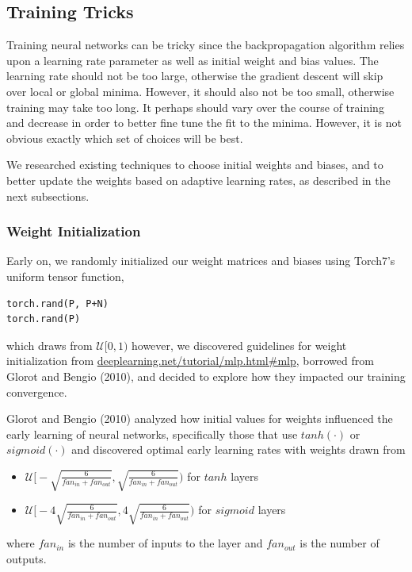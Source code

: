 \documentclass[11pt]{article}
\begin{document}
\subsection{Training Tricks}

Training neural networks can be tricky since the backpropagation algorithm relies upon a learning rate parameter as well as initial weight and bias values. The learning rate should not be too large, otherwise the gradient descent will skip over local or global minima. However, it should also not be too small, otherwise training may take too long. It perhaps should vary over the course of training and decrease in order to better fine tune the fit to the minima. However, it is not obvious exactly which set of choices will be best.

We researched existing techniques to choose initial weights and biases, and to better update the weights based on adaptive learning rates, as described in the next subsections.

\subsubsection{Weight Initialization}\label{Weights}

Early on, we randomly initialized our weight matrices and biases using Torch7's uniform tensor function,
\begin{lstlisting}
torch.rand(P, P+N)
torch.rand(P)
\end{lstlisting}
which draws from $\mathcal{U}[0, 1)$ however, we discovered guidelines for weight initialization from \hyperlink{http://deeplearning.net/tutorial/mlp.html\#mlp}{deeplearning.net/tutorial/mlp.html\#mlp}, borrowed from Glorot and Bengio (2010), and decided to explore how they impacted our training convergence.

Glorot and Bengio (2010) analyzed how initial values for weights influenced the early learning of neural networks, specifically those that use $tanh(\cdot)$ or $sigmoid(\cdot)$ and discovered optimal early learning rates with weights drawn from
\begin{itemize}
\item $\mathcal{U}\Big[-\sqrt{\frac{6}{fan_{in}+fan_{out}}},\sqrt{\frac{6}{fan_{in}+fan_{out}}}\Big)$ for $tanh$ layers
\item $\mathcal{U}\Big[-4\sqrt{\frac{6}{fan_{in}+fan_{out}}},4\sqrt{\frac{6}{fan_{in}+fan_{out}}}\Big)$ for $sigmoid$ layers
\end{itemize}
where $fan_{in}$ is the number of inputs to the layer and $fan_{out}$ is the number of outputs.
\end{document}
